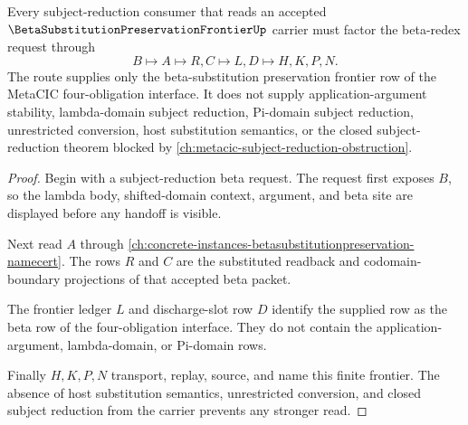 \begin{theorem}
\label{thm:beta-substitution-preservation-frontier-subject-reduction-route}
Every subject-reduction consumer that reads an accepted $\BetaSubstitutionPreservationFrontierUp$ carrier must factor the beta-redex request through
$$
B \longmapsto A \longmapsto R,C \longmapsto L,D \longmapsto H,K,P,N .
$$
The route supplies only the beta-substitution preservation frontier row of the MetaCIC four-obligation interface. It does not supply application-argument stability, lambda-domain subject reduction, Pi-domain subject reduction, unrestricted conversion, host substitution semantics, or the closed subject-reduction theorem blocked by \autoref{ch:metacic-subject-reduction-obstruction}.
\end{theorem}
\begin{proof}
Begin with a subject-reduction beta request. The request first exposes $B$, so the lambda body, shifted-domain context, argument, and beta site are displayed before any handoff is visible.

Next read $A$ through \autoref{ch:concrete-instances-betasubstitutionpreservation-namecert}. The rows $R$ and $C$ are the substituted readback and codomain-boundary projections of that accepted beta packet.

The frontier ledger $L$ and discharge-slot row $D$ identify the supplied row as the beta row of the four-obligation interface. They do not contain the application-argument, lambda-domain, or Pi-domain rows.

Finally $H,K,P,N$ transport, replay, source, and name this finite frontier. The absence of host substitution semantics, unrestricted conversion, and closed subject reduction from the carrier prevents any stronger read.
\end{proof}



